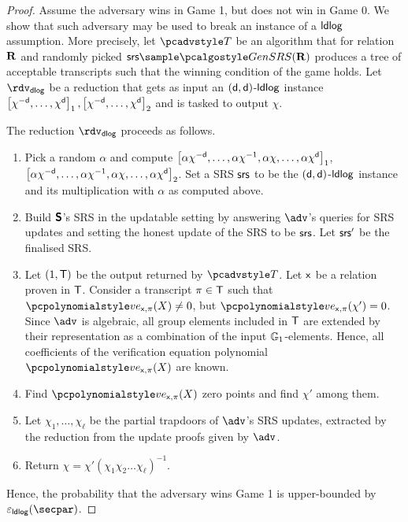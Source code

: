 \begin{proof}
	 Assume the adversary wins in Game 1, but does not
	win in Game 0. We show that such adversary may be used to break an
	instance of a $\mathsf{ldlog}$ assumption. More precisely, let $\tdv$ be an
	algorithm that for relation $\mathbf{R}$ and randomly picked
	$\srs \sample \kgen(\REL)$ produces a tree of acceptable transcripts such
	that the winning condition of the game holds. Let $\rdvdlog$ be a
	reduction that gets as input an
	$(\mathsf{d}, \mathsf{d})$-$\mathsf{ldlog}$ instance
	$\left[\chi^{-\mathsf{d}}, \ldots, \chi^{\mathsf{d}}\right]_{1}, \left[\chi^{-\mathsf{d}},
		\ldots, \chi^{\mathsf{d}}\right]_{2}$ and is tasked to output $\chi$.
	
	The reduction $\rdvdlog$ proceeds as follows.
	\begin{enumerate}
  \item Pick a random $\alpha$ and compute
    $\left[\alpha \chi^{- \mathsf{d}}, \ldots, \alpha \chi^{-1}, \alpha \chi,
      \ldots, \alpha \chi^{\mathsf{d}}\right]_{1}$,
    $\left[\alpha \chi^{- \mathsf{d}}, \ldots, \alpha \chi^{-1}, \alpha \chi,
      \ldots, \alpha \chi^{\mathsf{d}}\right]_{2}$. Set a SRS $\mathsf{srs}$ to be the
    $(\mathsf{d}, \mathsf{d})$-$\mathsf{ldlog}$ instance and its multiplication with $\alpha$ as
    computed above.
  \item Build $\bm{\mathsf{S}}$'s SRS in the updatable setting by answering $\adv$'s
    queries for SRS updates and setting the honest update of the SRS to be
    $\mathsf{srs}$. Let $\mathsf{srs}'$ be the finalised SRS.
		\item Let $(1, \mathsf{T})$ be the output returned by $\tdv$. Let $\mathsf{x}$ be a
		relation proven in $\mathsf{T}$.  Consider a transcript $\pi \in \mathsf{T}$ such
		that $\vereq_{\inp, \zkproof}(X) \neq 0$, but
		$\vereq_{\inp, \zkproof}(\chi') = 0$. Since $\adv$ is algebraic, all group
		elements included in $\mathsf{T}$ are extended by their representation as a
		combination of the input $\mathbb{G}_1$-elements. Hence, all coefficients of the
		verification equation polynomial $\vereq_{\inp, \zkproof}(X)$ are known.
		\item Find $\vereq_{\inp, \zkproof}(X)$ zero points and find $\chi'$ among
		them.
  \item Let $\chi_1, \ldots, \chi_\ell$ be the partial trapdoors of $\adv$'s SRS
    updates, extracted by the reduction from the update proofs given by $\adv$.
		\item Return  $\chi = \chi' (\chi_1 \chi_2 \ldots \chi_\ell)^{-1}$.
	\end{enumerate}
	Hence, the probability that the adversary wins Game 1 is upper-bounded by
	$\epsldlog(\secpar)$.
\end{proof}

